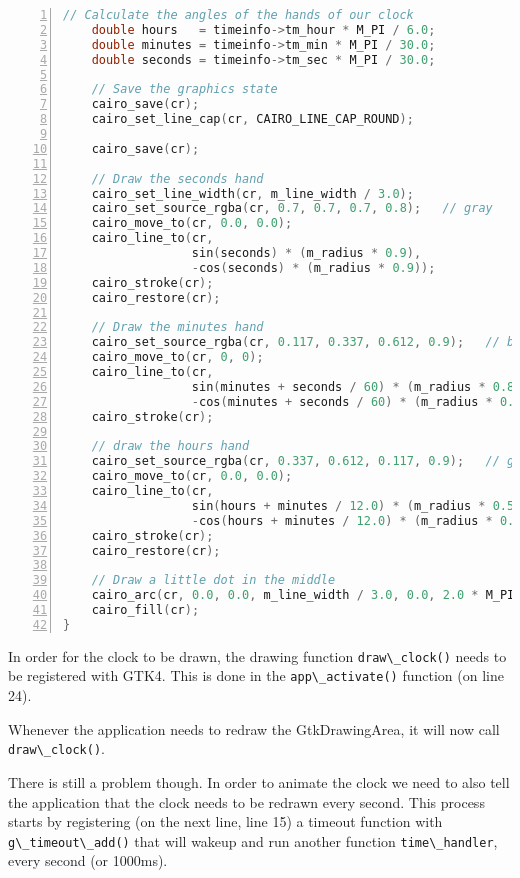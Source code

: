 \begin{lstlisting}[language=C, numbers=left]
    // Calculate the angles of the hands of our clock
    double hours   = timeinfo->tm_hour * M_PI / 6.0;
    double minutes = timeinfo->tm_min * M_PI / 30.0;
    double seconds = timeinfo->tm_sec * M_PI / 30.0;

    // Save the graphics state
    cairo_save(cr);
    cairo_set_line_cap(cr, CAIRO_LINE_CAP_ROUND);

    cairo_save(cr);

    // Draw the seconds hand
    cairo_set_line_width(cr, m_line_width / 3.0);
    cairo_set_source_rgba(cr, 0.7, 0.7, 0.7, 0.8);   // gray
    cairo_move_to(cr, 0.0, 0.0);
    cairo_line_to(cr,
                  sin(seconds) * (m_radius * 0.9),
                  -cos(seconds) * (m_radius * 0.9));
    cairo_stroke(cr);
    cairo_restore(cr);

    // Draw the minutes hand
    cairo_set_source_rgba(cr, 0.117, 0.337, 0.612, 0.9);   // blue
    cairo_move_to(cr, 0, 0);
    cairo_line_to(cr,
                  sin(minutes + seconds / 60) * (m_radius * 0.8),
                  -cos(minutes + seconds / 60) * (m_radius * 0.8));
    cairo_stroke(cr);

    // draw the hours hand
    cairo_set_source_rgba(cr, 0.337, 0.612, 0.117, 0.9);   // green
    cairo_move_to(cr, 0.0, 0.0);
    cairo_line_to(cr,
                  sin(hours + minutes / 12.0) * (m_radius * 0.5),
                  -cos(hours + minutes / 12.0) * (m_radius * 0.5));
    cairo_stroke(cr);
    cairo_restore(cr);

    // Draw a little dot in the middle
    cairo_arc(cr, 0.0, 0.0, m_line_width / 3.0, 0.0, 2.0 * M_PI);
    cairo_fill(cr);
}
\end{lstlisting}

In order for the clock to be drawn, the drawing function
\passthrough{\lstinline!draw\_clock()!} needs to be registered with
GTK4. This is done in the \passthrough{\lstinline!app\_activate()!}
function (on line 24).

Whenever the application needs to redraw the GtkDrawingArea, it will now
call \passthrough{\lstinline!draw\_clock()!}.

There is still a problem though. In order to animate the clock we need
to also tell the application that the clock needs to be redrawn every
second. This process starts by registering (on the next line, line 15) a
timeout function with \passthrough{\lstinline!g\_timeout\_add()!} that
will wakeup and run another function
\passthrough{\lstinline!time\_handler!}, every second (or 1000ms).

